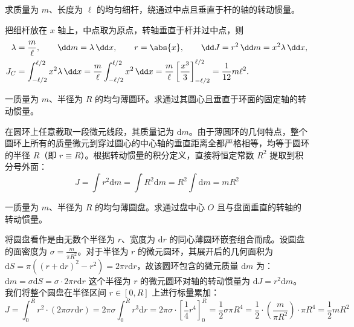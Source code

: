 \begin{exercise}[均匀细杆绕中心的转动惯量]
求质量为 \(m\)、长度为 \(\ell\) 的均匀细杆，绕通过中点且垂直于杆的轴的转动惯量。
\end{exercise}
\begin{solution}
把细杆放在 \(x\) 轴上，中点取为原点，转轴垂直于杆并过中点，则
\[
\begin{aligned}
\lambda&=\frac{m}{\ell},\qquad \dd m=\lambda\,\dd x,\qquad r=\abs{x},\qquad
\dd J=r^2\,\dd m=x^2\lambda\,\dd x,\\
J_C&=\int_{-\ell/2}^{\ell/2}x^2\lambda\,\dd x
=\frac{m}{\ell}\int_{-\ell/2}^{\ell/2}x^2\,\dd x
=\frac{m}{\ell}\left[\frac{x^3}{3}\right]_{-\ell/2}^{\ell/2}
=\frac{1}{12}m\ell^2.
\end{aligned}
\]
\end{solution}

\begin{exercise}
一质量为 $m$、半径为 $R$ 的均匀薄圆环。求通过其圆心且垂直于环面的固定轴的转动惯量。
\end{exercise}
\begin{solution}
在圆环上任意截取一段微元线段，其质量记为 $\mathrm{d}m$。由于薄圆环的几何特点，整个圆环上所有的质量微元到穿过圆心的中心轴的垂直距离全都严格相等，均等于圆环的半径 $R$（即 $r \equiv R$）。根据转动惯量的积分定义，直接将恒定常数 $R^2$ 提取到积分号外面：$$J = \int r^2 \mathrm{d}m = \int R^2 \mathrm{d}m = R^2 \int \mathrm{d}m=mR^2$$
\end{solution}

\begin{exercise}
 一质量为 $m$、半径为 $R$ 的均匀薄圆盘。求通过盘中心 $O$ 且与盘面垂直的转轴的转动惯量。
\end{exercise}
\begin{solution}
将圆盘看作是由无数个半径为 $r$、宽度为 $\mathrm{d}r$ 的同心薄圆环嵌套组合而成。设圆盘的面密度为 $\sigma = \frac{m}{\pi R^2}$。对于半径为 $r$ 的微元圆环，其展开后的几何面积为 $\mathrm{d}S=\pi((r+\mathrm{d}r)^2-r^2) = 2\pi r \mathrm{d}r$，故该圆环包含的微元质量 $\mathrm{d}m$ 为： \(\mathrm{d}m = \sigma \mathrm{d}S = \sigma \cdot 2\pi r \mathrm{d}r\) 
这个半径为 $r$ 的微元圆环对轴的转动惯量为 $\mathrm{d}J = r^2 \mathrm{d}m$。我们将整个圆盘在半径区间 $r \in [0, R]$ 上进行标量累加：$$J = \int_{0}^{R} r^2 \cdot (2\pi \sigma r \mathrm{d}r) = 2\pi \sigma \int_{0}^{R} r^3 \mathrm{d}r= 2\pi \sigma \cdot \left[ \frac{1}{4}r^4 \right]_0^R = \frac{1}{2}\sigma \pi R^4 = \frac{1}{2} \cdot \left(\frac{m}{\pi R^2}\right) \cdot \pi R^4 = \frac{1}{2}mR^2$$
\end{solution}

